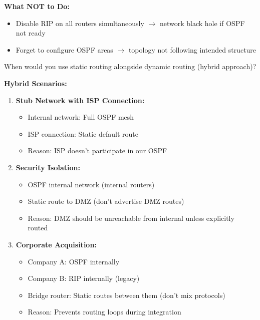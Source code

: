 \documentclass[12pt,a4paper]{article}
\begin{document}
\begin{abox}
\textbf{What NOT to Do:}
\begin{itemize}
    \item Disable RIP on all routers simultaneously $\rightarrow$ network black hole if OSPF not ready
    \item Forget to configure OSPF areas $\rightarrow$ topology not following intended structure
\end{itemize}
\end{abox}


\begin{qbox}{When would you use static routing alongside dynamic routing (hybrid approach)?}
\end{qbox}

\begin{abox}
\textbf{Hybrid Scenarios:}

\begin{enumerate}
    \item \textbf{Stub Network with ISP Connection:}
    \begin{itemize}
        \item Internal network: Full OSPF mesh
        \item ISP connection: Static default route
        \item Reason: ISP doesn't participate in our OSPF
    \end{itemize}

    \item \textbf{Security Isolation:}
    \begin{itemize}
        \item OSPF internal network (internal routers)
        \item Static route to DMZ (don't advertise DMZ routes)
        \item Reason: DMZ should be unreachable from internal unless explicitly routed
    \end{itemize}

    \item \textbf{Corporate Acquisition:}
    \begin{itemize}
        \item Company A: OSPF internally
        \item Company B: RIP internally (legacy)
        \item Bridge router: Static routes between them (don't mix protocols)
        \item Reason: Prevents routing loops during integration
    \end{itemize}


\end{enumerate}
\end{abox}
\end{document}
